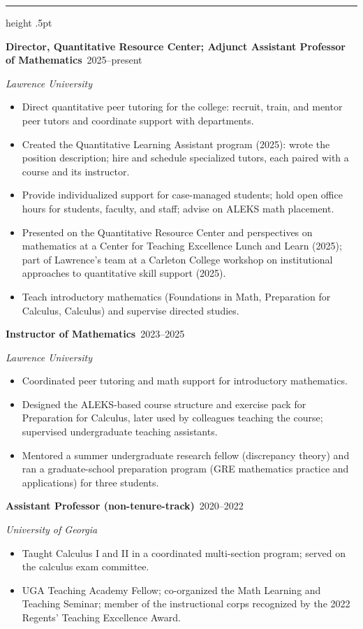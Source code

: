 \documentclass[11pt]{article}
\newcommand{\sect}[1]{\par\vspace{7pt}{\large\bfseries #1}\par\vspace{1pt}%
  {\color{rule}\hrule height .5pt}\vspace{4pt}}
\newcommand{\role}[3]{\par\vspace{3pt}\textbf{#1}\ \hfill\mbox{#3}\par   %
  {\itshape #2}\par}
\begin{document}
\sect{Experience}
\role{Director, Quantitative Resource Center; Adjunct Assistant Professor of Mathematics}{Lawrence University}{2025--present}
\begin{itemize}
  \item Direct quantitative peer tutoring for the college: recruit, train, and mentor peer tutors and coordinate
        support with departments.
  \item Created the Quantitative Learning Assistant program (2025): wrote the position description; hire and
        schedule specialized tutors, each paired with a course and its instructor.
  \item Provide individualized support for case-managed students; hold open office hours for students,
        faculty, and staff; advise on ALEKS math placement.
  \item Presented on the Quantitative Resource Center and perspectives on mathematics at a Center for Teaching
        Excellence Lunch and Learn (2025); part of Lawrence's team at a Carleton College workshop on
        institutional approaches to quantitative skill support (2025).
  \item Teach introductory mathematics (Foundations in Math, Preparation for Calculus, Calculus) and supervise
        directed studies.
\end{itemize}
\role{Instructor of Mathematics}{Lawrence University}{2023--2025}
\begin{itemize}
  \item Coordinated peer tutoring and math support for introductory mathematics.
  \item Designed the ALEKS-based course structure and exercise pack for Preparation for Calculus, later used by
        colleagues teaching the course; supervised undergraduate teaching assistants.
  \item Mentored a summer undergraduate research fellow (discrepancy theory) and ran a graduate-school
        preparation program (GRE mathematics practice and applications) for three students.
\end{itemize}
\role{Assistant Professor (non-tenure-track)}{University of Georgia}{2020--2022}
\begin{itemize}
  \item Taught Calculus I and II in a coordinated multi-section program; served on the calculus exam committee.
  \item UGA Teaching Academy Fellow; co-organized the Math Learning and Teaching Seminar; member of the
        instructional corps recognized by the 2022 Regents' Teaching Excellence Award.
\end{itemize}
\end{document}
